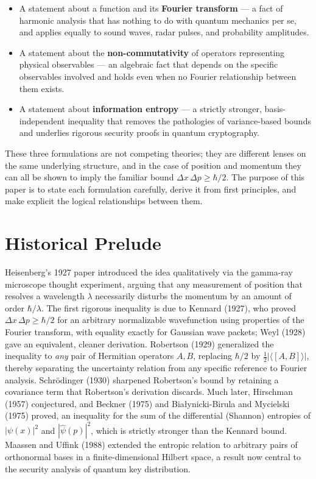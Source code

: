 \documentclass[11pt]{article}
\theoremstyle{plain}
\theoremstyle{definition}
\theoremstyle{remark}
\begin{document}
\begin{itemize}[leftmargin=1.5em]
\item A statement about a function and its \textbf{Fourier transform} --- a fact of harmonic
analysis that has nothing to do with quantum mechanics per se, and applies equally to sound
waves, radar pulses, and probability amplitudes.
\item A statement about the \textbf{non-commutativity} of operators representing physical
observables --- an algebraic fact that depends on the specific observables involved and holds
even when no Fourier relationship between them exists.
\item A statement about \textbf{information entropy} --- a strictly stronger, basis-independent
inequality that removes the pathologies of variance-based bounds and underlies rigorous security
proofs in quantum cryptography.
\end{itemize}

These three formulations are not competing theories; they are different lenses on the same
underlying structure, and in the case of position and momentum they can all be shown to imply the
familiar bound $\Delta x\, \Delta p \geq \hbar/2$. The purpose of this paper is to state each
formulation carefully, derive it from first principles, and make explicit the logical
relationships between them.

\section{Historical Prelude}

Heisenberg's 1927 paper introduced the idea qualitatively via the gamma-ray microscope thought
experiment, arguing that any measurement of position that resolves a wavelength $\lambda$
necessarily disturbs the momentum by an amount of order $\hbar/\lambda$. The first rigorous
inequality is due to Kennard (1927), who proved $\Delta x\,\Delta p \geq \hbar/2$ for an arbitrary
normalizable wavefunction using properties of the Fourier transform, with equality exactly for
Gaussian wave packets; Weyl (1928) gave an equivalent, cleaner derivation. Robertson (1929)
generalized the inequality to \emph{any} pair of Hermitian operators $A,B$, replacing $\hbar/2$ by
$\tfrac12|\langle[A,B]\rangle|$, thereby separating the uncertainty relation from any specific
reference to Fourier analysis. Schr\"odinger (1930) sharpened Robertson's bound by retaining a
covariance term that Robertson's derivation discards. Much later, Hirschman (1957) conjectured,
and Beckner (1975) and Bia\l ynicki-Birula and Mycielski (1975) proved, an inequality for the sum
of the differential (Shannon) entropies of $|\psi(x)|^2$ and $|\hat\psi(p)|^2$, which is strictly
stronger than the Kennard bound. Maassen and Uffink (1988) extended the entropic relation to
arbitrary pairs of orthonormal bases in a finite-dimensional Hilbert space, a result now central
to the security analysis of quantum key distribution.
\end{document}
